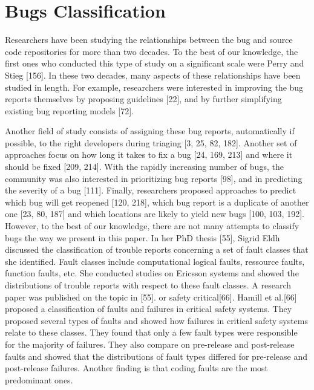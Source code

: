 \documentclass[12pt]{report}
\begin{document}
\section{Bugs Classification}\label{bugs-classification}

Researchers have been studying the relationships between the bug and
source code repositories for more than two decades. To the best of our
knowledge, the first ones who conducted this type of study on a
significant scale were Perry and Stieg {[}156{]}. In these two decades,
many aspects of these relationships have been studied in length. For
example, researchers were interested in improving the bug reports
themselves by proposing guidelines {[}22{]}, and by further simplifying
existing bug reporting models {[}72{]}.

Another field of study consists of assigning these bug reports,
automatically if possible, to the right developers during triaging {[}3,
25, 82, 182{]}. Another set of approaches focus on how long it takes to
fix a bug {[}24, 169, 213{]} and where it should be fixed {[}209,
214{]}. With the rapidly increasing number of bugs, the community was
also interested in prioritizing bug reports {[}98{]}, and in predicting
the severity of a bug {[}111{]}. Finally, researchers proposed
approaches to predict which bug will get reopened {[}120, 218{]}, which
bug report is a duplicate of another one {[}23, 80, 187{]} and which
locations are likely to yield new bugs {[}100, 103, 192{]}. However, to
the best of our knowledge, there are not many attempts to classify bugs
the way we present in this paper. In her PhD thesis {[}55{]}, Sigrid
Eldh discussed the classification of trouble reports concerning a set of
fault classes that she identified. Fault classes include computational
logical faults, ressource faults, function faults, etc. She conducted
studies on Ericsson systems and showed the distributions of trouble
reports with respect to these fault classes. A research paper was
published on the topic in {[}55{]}. or safety critical{[}66{]}. Hamill
et al.{[}66{]} proposed a classification of faults and failures in
critical safety systems. They proposed several types of faults and
showed how failures in critical safety systems relate to these classes.
They found that only a few fault types were responsible for the majority
of failures. They also compare on pre-release and post-release faults
and showed that the distributions of fault types differed for
pre-release and post-release failures. Another finding is that coding
faults are the most predominant ones.
\end{document}
